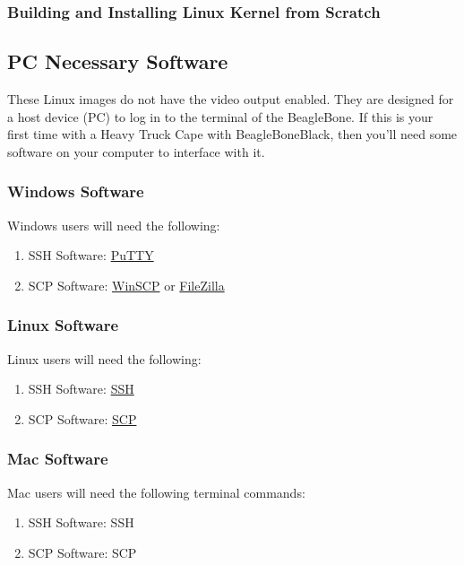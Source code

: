         \subsubsection{Building and Installing Linux Kernel from Scratch}
        
    \subsection{PC Necessary Software}
        These Linux images do not have the video output enabled. They are designed for a host device (PC) to log in to the terminal of the BeagleBone. If this is your first time with a Heavy Truck Cape with BeagleBoneBlack, then you'll need some software on your computer to interface with it. 
        
        \subsubsection{Windows Software}
        Windows users will need the following:
            \begin{enumerate}
                \item SSH Software: \href{https://www.chiark.greenend.org.uk/~sgtatham/putty/}{PuTTY}
                \item SCP Software: \href{https://winscp.net/eng/index.php}{WinSCP}  or \href{https://filezilla-project.org/}{FileZilla}
            \end{enumerate}
        \subsubsection{Linux Software}
        Linux users will need the following:
            \begin{enumerate}
                \item SSH Software: \href{https://linuxcommandlibrary.com/man/ssh}{SSH}
                \item SCP Software: \href{https://linuxcommandlibrary.com/man/scp}{SCP}
            \end{enumerate}
        \subsubsection{Mac Software}
        Mac users will need the following terminal commands:
        \begin{enumerate}
                \item SSH Software: SSH
                \item SCP Software: SCP
            \end{enumerate}
        
